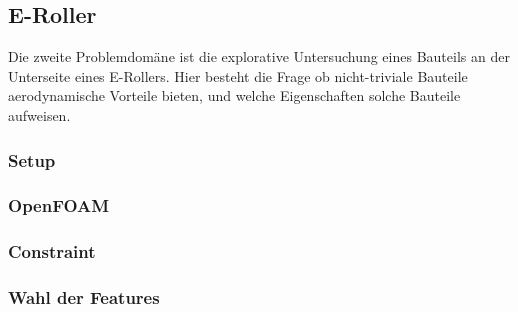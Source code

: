 \subsection{E-Roller}

Die zweite Problemdomäne ist die explorative Untersuchung eines Bauteils an der Unterseite eines E-Rollers.
Hier besteht die Frage ob nicht-triviale Bauteile aerodynamische Vorteile bieten, und welche Eigenschaften solche Bauteile aufweisen.

\subsubsection{Setup}
\subsubsection{OpenFOAM}
\subsubsection{Constraint}
\subsubsection{Wahl der Features}





